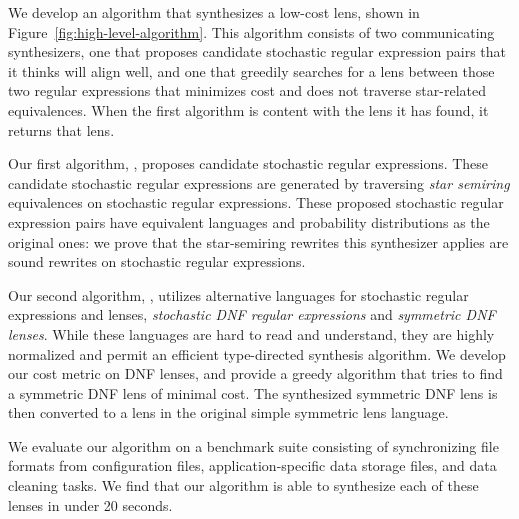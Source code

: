\documentclass[acmsmall,screen,anonymous]{acmart}
\begin{document}

We develop an algorithm that synthesizes a low-cost lens, shown in
Figure~\ref{fig:high-level-algorithm}. This algorithm consists of two
communicating synthesizers, one that proposes candidate stochastic regular
expression pairs that it thinks will align well, and one that greedily searches
for a lens between those two regular expressions that minimizes cost and does
not traverse star-related equivalences. When the first algorithm is content with
the lens it has found, it returns that lens. 

Our first algorithm, \RXSearch, proposes candidate stochastic regular
expressions. These candidate stochastic regular expressions are generated by
traversing \emph{star semiring} equivalences on stochastic regular expressions.
These proposed stochastic regular expression pairs have equivalent languages and
probability distributions as the original ones: we prove that the star-semiring
rewrites this synthesizer applies are sound rewrites on stochastic regular
expressions.

Our second algorithm, \GreedySynth, utilizes alternative languages for
stochastic regular expressions and lenses, \emph{stochastic DNF regular
  expressions} and \emph{symmetric DNF lenses}. While these languages are hard
to read and understand, they are highly normalized and permit an efficient
type-directed synthesis algorithm. We develop our cost metric on DNF lenses, and
provide a greedy algorithm that tries to find a symmetric DNF lens of minimal
cost. The synthesized symmetric DNF lens is then converted to a lens in the
original simple symmetric lens language.


We evaluate our algorithm on a benchmark suite consisting of synchronizing file
formats from configuration files, application-specific data storage files, and
data cleaning tasks. We find that our algorithm is able to synthesize each of
these lenses in under 20 seconds.
\end{document}
